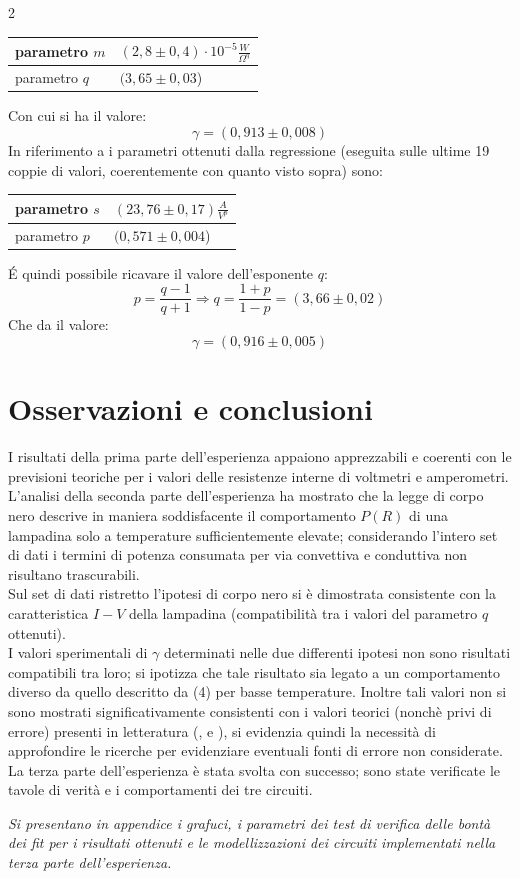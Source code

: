 \documentclass{article}
\begin{document}
\begin{multicols}{2}
\begin{center}
    \begin{tabular}{|l|l|}
\hline
parametro \(m\) & \((2,8\pm0,4) \cdot 10^{-5} \frac{W}{\Omega^q}\) \\ \hline
parametro \(q\) & \((3,65\pm0,03\))                                \\ \hline
\end{tabular}
\end{center}
Con cui si ha il valore:
\[\gamma=(0,913\pm 0,008)\]
In riferimento a  i parametri ottenuti dalla regressione (eseguita sulle ultime 19 coppie di valori, coerentemente con quanto visto sopra) sono: 
\begin{center}
    \begin{tabular}{|l|l|}
\hline
parametro \(s\) & \((23,76\pm0,17) \frac{A}{V^p}\) \\ \hline
parametro \(p\) & \((0,571\pm0,004\))             \\ \hline
\end{tabular}
\end{center}
É quindi possibile ricavare il valore dell'esponente \(q\):
\[p=\frac{q-1}{q+1} \Rightarrow q=\frac{1+p}{1-p}=(3,66\pm0,02)\]
Che da il valore:
\[\gamma=(0,916\pm 0,005)\]
\section{Osservazioni e conclusioni}
I risultati della prima parte dell'esperienza appaiono apprezzabili e coerenti con le previsioni teoriche \cite{boylestad} per i valori delle resistenze interne di voltmetri e amperometri.\\
L'analisi della seconda parte dell'esperienza ha mostrato che la legge di corpo nero descrive in maniera soddisfacente il comportamento \(P(R)\) di una lampadina solo a temperature sufficientemente elevate; considerando l'intero set di dati i termini di potenza consumata per via convettiva e conduttiva non risultano trascurabili.\\
Sul set di dati ristretto l'ipotesi di corpo nero si è dimostrata consistente con la caratteristica \(I-V\) della lampadina (compatibilità tra i valori del parametro \(q\) ottenuti).\\
I valori sperimentali di \(\gamma\) determinati nelle due differenti ipotesi non sono risultati compatibili tra loro; si ipotizza che tale risultato sia legato a un comportamento diverso da quello descritto da (4) per basse temperature. Inoltre tali valori non si sono mostrati significativamente consistenti con i valori teorici (nonchè privi di errore) presenti in letteratura (\cite{gluck}, \cite{clauss} e \cite{agrawal}), si evidenzia quindi la necessità di approfondire le ricerche per evidenziare eventuali fonti di errore non considerate.\\ 
La terza parte dell'esperienza è stata svolta con successo; sono state verificate le tavole di verità e i comportamenti dei tre circuiti.
\end{multicols}
\medskip
\noindent
\textit{Si presentano in appendice i grafuci, i parametri dei test di verifica delle bontà dei fit per i risultati ottenuti e le modellizzazioni dei circuiti implementati nella terza parte dell'esperienza.}
\end{document}
